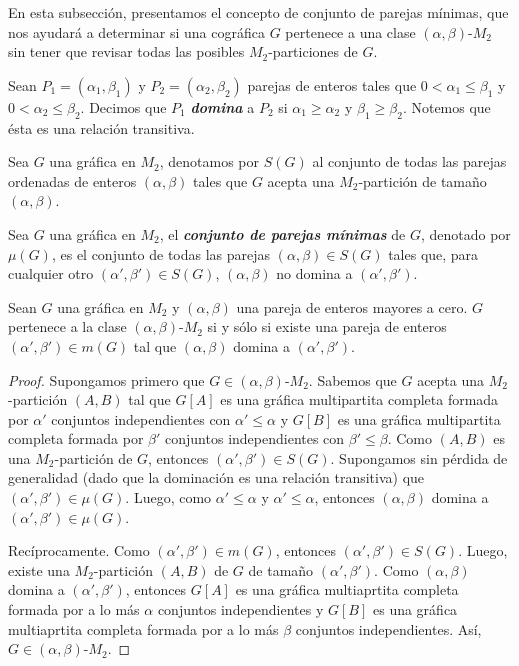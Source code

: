 En esta subsección, presentamos el concepto de conjunto de parejas mínimas, que nos ayudará a determinar si una cográfica $G$ pertenece a una clase $(\alpha, \beta)$-$M_2$ sin tener que revisar todas las posibles $M_2$-particiones de $G$.

Sean $P_1=(\alpha_1, \beta_1)$ y $P_2=(\alpha_2, \beta_2)$ parejas de enteros tales que $0 < \alpha_1 \le \beta_1$ y $0 < \alpha_2 \le \beta_2$. Decimos que $P_1$ \emph{\textbf{domina}} a $P_2$ si $\alpha_1 \geq \alpha_2$ y $\beta_1 \geq \beta_2$. Notemos que ésta es una relación transitiva.

Sea $G$ una gráfica en $M_2$, denotamos por $S(G)$ al conjunto de todas las parejas ordenadas de enteros $(\alpha, \beta)$ tales que $G$ acepta una $M_2$-partición de tamaño $(\alpha, \beta)$. 

Sea $G$ una gráfica en $M_2$, el \textbf{\emph{conjunto de parejas mínimas}} de $G$, denotado por $\mu(G)$, es el conjunto de todas las parejas $(\alpha, \beta)\in S(G)$ tales que, para cualquier otro $(\alpha', \beta')\in S(G)$, $(\alpha, \beta)$ no domina a $(\alpha', \beta')$.

\begin{lemma}
Sean $G$ una gráfica en $M_2$ y $(\alpha, \beta)$ una pareja de enteros mayores a cero. $G$ pertenece a la clase $(\alpha, \beta)$-$M_2$ si y sólo si existe una pareja de enteros $(\alpha', \beta')\in m(G)$ tal que $(\alpha, \beta)$ domina a $(\alpha', \beta')$.
\end{lemma}

\begin{proof}
Supongamos primero que $G\in (\alpha, \beta)\text{-}M_2$. Sabemos que $G$ acepta una $M_2$-partición $(A,B)$ tal que $G[A]$ es una gráfica multipartita completa formada por $\alpha'$ conjuntos independientes con $\alpha' \le \alpha$ y $G[B]$ es una gráfica multipartita completa formada por $\beta'$ conjuntos independientes con $\beta' \le \beta$. Como $(A,B)$ es una $M_2$-partición de $G$, entonces $(\alpha', \beta')\in S(G)$. Supongamos sin pérdida de generalidad (dado que la dominación es una relación transitiva) que $(\alpha', \beta')\in \mu(G)$. Luego, como $\alpha' \le \alpha$ y $\alpha' \le \alpha$, entonces $(\alpha, \beta)$ domina a $(\alpha', \beta') \in \mu(G)$. 

Recíprocamente. Como $(\alpha', \beta')\in m(G)$, entonces $(\alpha', \beta')\in S(G)$. Luego, existe una $M_2$-partición $(A,B)$ de $G$ de tamaño $(\alpha', \beta')$. Como $(\alpha, \beta)$ domina a $(\alpha', \beta')$, entonces $G[A]$ es una gráfica multiaprtita completa formada por a lo más $\alpha$ conjuntos independientes y $G[B]$ es una gráfica multiaprtita completa formada por a lo más $\beta$ conjuntos independientes. Así, $G\in (\alpha, \beta)\text{-}M_2$.
\end{proof}
